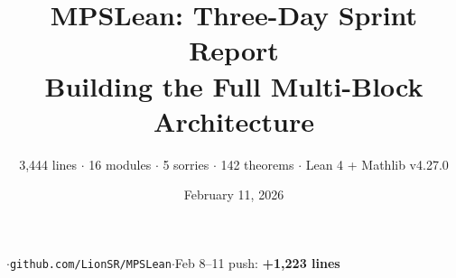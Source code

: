 \documentclass[aspectratio=169,10pt]{beamer}
\title{\textbf{MPSLean: Three-Day Sprint Report\\Building the Full Multi-Block Architecture}}
\subtitle{{\small 3,444 lines $\cdot$ 16 modules $\cdot$ 5 sorries $\cdot$ 142 theorems  $\cdot$  Lean 4 + Mathlib v4.27.0}}
\date{February 11, 2026}
\author{}
\begin{document}
{%
\begin{frame}
\vspace{-1em}
\maketitle
\vspace{-2em}
\begin{center}
{\footnotesize \cite{Cirac2021Matrix}\quad$\cdot$\quad\texttt{github.com/LionSR/MPSLean}\quad$\cdot$\quad Feb 8--11 push: \textbf{+1,223 lines}}
\end{center}
\end{frame}
}
\end{document}
